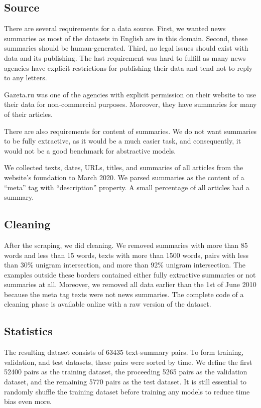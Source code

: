 \documentclass[runningheads]{llncs}
\begin{document}
\subsection{Source}
There are several requirements for a data source. First, we wanted news summaries as most of the datasets in English are in this domain. Second, these summaries should be human-generated. Third, no legal issues should exist with data and its publishing. The last requirement was hard to fulfill as many news agencies have explicit restrictions for publishing their data and tend not to reply to any letters.

Gazeta.ru was one of the agencies with explicit permission on their website to use their data for non-commercial purposes. Moreover, they have summaries for many of their articles.

There are also requirements for content of summaries. We do not want summaries to be fully extractive, as it would be a much easier task, and consequently, it would not be a good benchmark for abstractive models.

We collected texts, dates, URLs, titles, and summaries of all articles from the website's foundation to March 2020. We parsed summaries as the content of a ``meta'' tag with ``description'' property. A small percentage of all articles had a summary.

\subsection{Cleaning}
After the scraping, we did cleaning. We removed summaries with more than 85 words and less than 15 words, texts with more than 1500 words, pairs with less than 30\% unigram intersection, and more than 92\% unigram intersection. The examples outside these borders contained either fully extractive summaries or not summaries at all. Moreover, we removed all data earlier than the 1st of June 2010 because the meta tag texts were not news summaries. The complete code of a cleaning phase is available online with a raw version of the dataset.

\subsection{Statistics}
The resulting dataset consists of 63435 text-summary pairs. To form training, validation, and test datasets, these pairs were sorted by time. We define the first 52400 pairs as the training dataset, the proceeding 5265 pairs as the validation dataset, and the remaining 5770 pairs as the test dataset. It is still essential to randomly shuffle the training dataset before training any models to reduce time bias even more.
\end{document}
